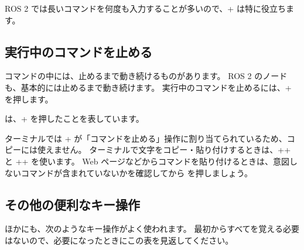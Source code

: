 ROS 2 では長いコマンドを何度も入力することが多いので、+ は特に役立ちます。

\subsection{実行中のコマンドを止める}

コマンドの中には、止めるまで動き続けるものがあります。
ROS 2 のノードも、基本的には止めるまで動き続けます。
実行中のコマンドを止めるには、+ を押します。


 は、+ を押したことを表しています。

\begin{caution}
  ターミナルでは + が「コマンドを止める」操作に割り当てられているため、コピーには使えません。
  ターミナルで文字をコピー・貼り付けするときは、++ と ++ を使います。
  Web ページなどからコマンドを貼り付けるときは、意図しないコマンドが含まれていないかを確認してから  を押しましょう。
\end{caution}

\subsection{その他の便利なキー操作}

ほかにも、次のようなキー操作がよく使われます。
最初からすべてを覚える必要はないので、必要になったときにこの表を見返してください。

